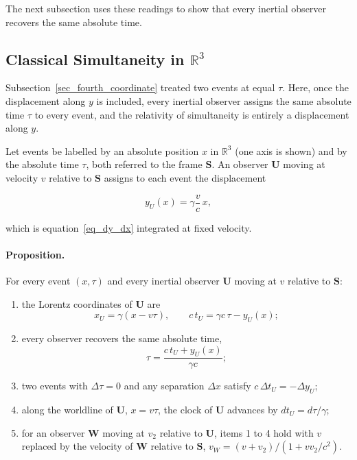 \documentclass{iopjournal}
\begin{document}
The next subsection uses these readings to show that every inertial observer recovers the same absolute time.

\subsection{Classical Simultaneity in \texorpdfstring{$\mathbb{R}^3$}{R3}}\label{sec_classical_simultaneity}

Subsection~\ref{sec_fourth_coordinate} treated two events at equal $\tau$. Here, once the displacement along $y$ is included, every inertial observer assigns the same absolute time $\tau$ to every event, and the relativity of simultaneity is entirely a displacement along $y$.

Let events be labelled by an absolute position $x$ in $\mathbb{R}^3$ (one axis is shown) and by the absolute time $\tau$, both referred to the frame $\mathbf{S}$. An observer $\mathbf{U}$ moving at velocity $v$ relative to $\mathbf{S}$ assigns to each event the displacement

\begin{equation}\label{eq_y_offset}
    y_U(x)=\gamma\frac{v}{c}\,x ,
\end{equation}

which is equation~\eqref{eq_dy_dx} integrated at fixed velocity.

\paragraph{Proposition.} For every event $(x,\tau)$ and every inertial observer $\mathbf{U}$ moving at $v$ relative to $\mathbf{S}$:
\begin{enumerate}
\item the Lorentz coordinates of $\mathbf{U}$ are
\begin{equation}\label{eq_observer_clock}
    x_U=\gamma\left(x-v\tau\right),
    \qquad
    c\,t_U=\gamma c\,\tau-y_U(x) ;
\end{equation}
\item every observer recovers the same absolute time,
\begin{equation}\label{eq_tau_recovered}
    \tau=\frac{c\,t_U+y_U(x)}{\gamma c} ;
\end{equation}
\item two events with $\Delta\tau=0$ and any separation $\Delta x$ satisfy $c\,\Delta t_U=-\Delta y_U$;
\item along the worldline of $\mathbf{U}$, $x=v\tau$, the clock of $\mathbf{U}$ advances by $dt_U=d\tau/\gamma$;
\item for an observer $\mathbf{W}$ moving at $v_2$ relative to $\mathbf{U}$, items 1 to 4 hold with $v$ replaced by the velocity of $\mathbf{W}$ relative to $\mathbf{S}$, $v_W=(v+v_2)/(1+vv_2/c^2)$.
\end{enumerate}
\end{document}
